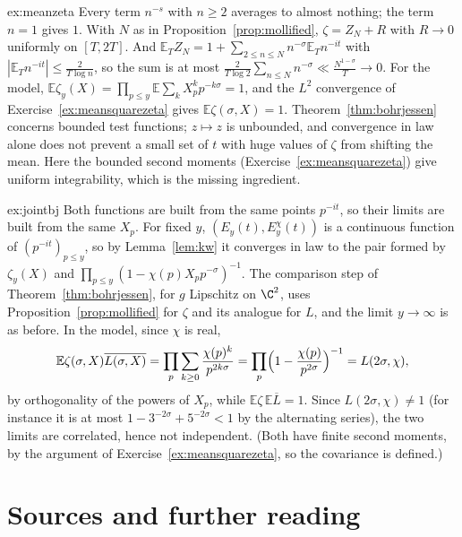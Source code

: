 \begin{solution}{ex:meanzeta}
\idea Every term $n^{-s}$ with $n\ge2$ averages to almost nothing; the term $n=1$ gives $1$.
\writeup With $N$ as in Proposition~\ref{prop:mollified}, $\zeta=Z_N+R$ with $R\to0$ uniformly on $[T,2T]$. And $\mathbb E_TZ_N=1+\sum_{2\le n\le N}n^{-\sigma}\mathbb E_Tn^{-it}$ with $|\mathbb E_Tn^{-it}|\le\frac2{T\log n}$, so the sum is at most $\frac2{T\log2}\sum_{n\le N}n^{-\sigma}\ll\frac{N^{1-\sigma}}T\to0$. For the model, $\mathbb E\zeta_y(X)=\prod_{p\le y}\mathbb E\sum_kX_p^kp^{-k\sigma}=1$, and the $L^2$ convergence of Exercise~\ref{ex:meansquarezeta} gives $\mathbb E\zeta(\sigma,X)=1$. Theorem~\ref{thm:bohrjessen} concerns bounded test functions; $z\mapsto z$ is unbounded, and convergence in law alone does not prevent a small set of $t$ with huge values of $\zeta$ from shifting the mean. Here the bounded second moments (Exercise~\ref{ex:meansquarezeta}) give uniform integrability, which is the missing ingredient.
\end{solution}

\begin{solution}{ex:jointbj}
\idea Both functions are built from the same points $p^{-it}$, so their limits are built from the same $X_p$.
\writeup For fixed $y$, $(E_y(t),E_y^\chi(t))$ is a continuous function of $(p^{-it})_{p\le y}$, so by Lemma~\ref{lem:kw} it converges in law to the pair formed by $\zeta_y(X)$ and $\prod_{p\le y}(1-\chi(p)X_pp^{-\sigma})^{-1}$. The comparison step of Theorem~\ref{thm:bohrjessen}, for $g$ Lipschitz on $\C^2$, uses Proposition~\ref{prop:mollified} for $\zeta$ and its analogue for $L$, and the limit $y\to\infty$ is as before. In the model, since $\chi$ is real,
\[
\mathbb E\zeta(\sigma,X)\overline{L(\sigma,X)}=\prod_p\sum_{k\ge0}\frac{\chi(p)^k}{p^{2k\sigma}}=\prod_p\Bigl(1-\frac{\chi(p)}{p^{2\sigma}}\Bigr)^{-1}=L(2\sigma,\chi),
\]
by orthogonality of the powers of $X_p$, while $\mathbb E\zeta\,\mathbb E\overline L=1$. Since $L(2\sigma,\chi)\ne1$ (for instance it is at most $1-3^{-2\sigma}+5^{-2\sigma}<1$ by the alternating series), the two limits are correlated, hence not independent. (Both have finite second moments, by the argument of Exercise~\ref{ex:meansquarezeta}, so the covariance is defined.)
\end{solution}

\section*{Sources and further reading}

